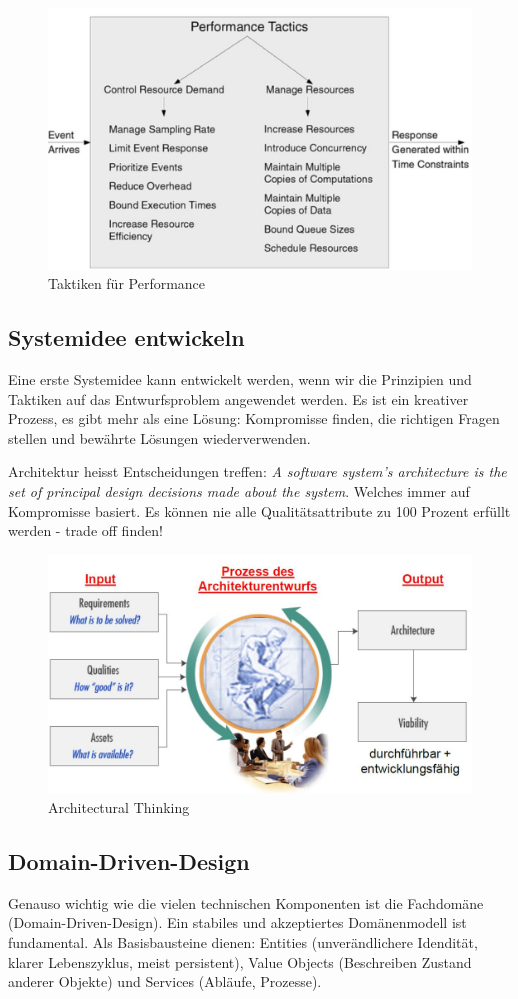 \begin{figure}[h!]
	\centering
	\includegraphics[width=0.7\linewidth]{fig/tactic-performance}
	\caption{Taktiken für Performance}
	\label{fig:tactic-performance}
\end{figure}

\newpage

\subsection{Systemidee entwickeln}
Eine erste Systemidee kann entwickelt werden, wenn wir die Prinzipien und Taktiken auf das Entwurfsproblem angewendet werden. Es ist ein kreativer Prozess, es gibt mehr als eine Lösung: Kompromisse finden, die richtigen Fragen stellen und bewährte Lösungen wiederverwenden.

Architektur heisst Entscheidungen treffen: \emph{A software system's architecture is the set of principal design decisions made about the system}. Welches immer auf Kompromisse basiert. Es können nie alle Qualitätsattribute zu 100 Prozent erfüllt werden - trade off finden!

\begin{figure}[h!]
\centering
\includegraphics[width=0.7\linewidth]{fig/architectural-thinking}
\caption{Architectural Thinking}
\label{fig:architectural-thinking}
\end{figure}

\subsection{Domain-Driven-Design}
Genauso wichtig wie die vielen technischen Komponenten ist die Fachdomäne (Domain-Driven-Design). Ein stabiles und akzeptiertes Domänenmodell ist fundamental. Als Basisbausteine dienen: Entities (unverändlichere Idendität, klarer Lebenszyklus, meist persistent), Value Objects (Beschreiben Zustand anderer Objekte) und Services (Abläufe, Prozesse).


